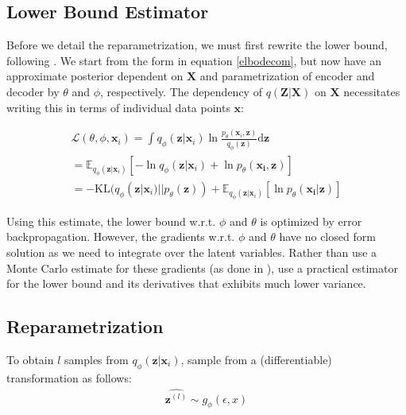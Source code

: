 \documentclass{report}
\begin{document}
\subsection{Lower Bound Estimator}\label{sgvbest}
Before we detail the reparametrization, we must first rewrite the lower bound, following \cite{kingma2013auto}. We start from the form in equation \ref{elbodecom}, but now have an approximate posterior dependent on $\mathbf{X}$ and parametrization of encoder and decoder by $\theta$ and $\phi$, respectively. The dependency of $q(\mathbf{Z}|\mathbf{X})$ on $\mathbf{X}$ necessitates writing this in terms of individual data points $\mathbf{x}$:

\begin{align}
\mathcal{L}(\theta, \phi, \mathbf{x}_i) = \int q_\phi(\mathbf{z}|\mathbf{x}_i) \ln \frac{p_\theta(\mathbf{x}_i,\mathbf{{z}})}{q_\phi(\mathbf{z})}\text{d}\mathbf{z} \\
= \mathbb{E}_{q_\phi(\mathbf{z}|\mathbf{x}_i)}[-\ln q_\phi (\mathbf{z}|\mathbf{x}_i)+\ln p_\theta (\mathbf{x_i,z})] \\
= -\text{KL}(q_\phi(\mathbf{z}|\mathbf{x}_i)||p_\theta(\mathbf{{z}})) + \mathbb{E}_{q_\phi(\mathbf{z}|\mathbf{x}_i)}[\ln p_\theta (\mathbf{x_i|z})] \label{lbestVAE}
\end{align}

Using this estimate, the lower bound w.r.t. $\phi$ and $\theta$ is optimized by error backpropagation. However, the gradients w.r.t. $\phi$ and $\theta$ have no closed form solution as we need to integrate over the latent variables. Rather than use a Monte Carlo estimate for these gradients (as done in \cite{paisley2012variational}), \cite{kingma2013auto} use a practical estimator for the lower bound and its derivatives that exhibits much lower variance.

\subsection{Reparametrization}\label{reparametrization}
To obtain $l$ samples from $q_\phi(\mathbf{z}|\mathbf{x}_i)$, \cite{kingma2013auto} sample from a (differentiable) transformation as follows: \begin{align}
\hat{\mathbf{z}^{(l)}}  \sim g_\phi (\epsilon,x)
\end{align}
\end{document}
